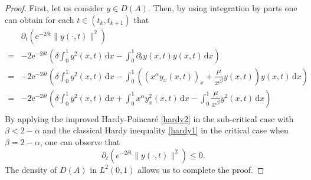 \documentclass[sn-mathphys]{sn-jnl}
\begin{document}
\begin{proof}
    First, let us consider $y \in D(A)$. Then, by using integration by parts one can obtain for each $t \in (t_k,t_{k+1})$ that
    \begin{align*}
        &\partial_t\left(\mathrm{e}^{-2\delta t} \|y(\cdot,t)\|^2\right)\\
        = &-2 \mathrm{e}^{-2\delta t}\left( \delta \int_0^1 y^2(x,t) \,\mathrm{d}x - \int_0^1 \partial_t y(x,t) y(x,t) \,\mathrm{d}x\right)\\
        = &-2 \mathrm{e}^{-2\delta t}\left( \delta \int_0^1 y^2(x,t) \,\mathrm{d}x - \int_0^1 \left( (x^{\alpha} y_x(x,t))_x + \dfrac{\mu}{x^{\beta}} y(x,t) \right) y(x,t) \,\mathrm{d}x\right)\\
        = &-2 \mathrm{e}^{-2\delta t}\left( \delta \int_0^1 y^2(x,t) \,\mathrm{d}x + \int_0^1 x^{\alpha} y_x^2(x,t) \,\mathrm{d}x - \int_0^1 \dfrac{\mu}{x^{\beta}} y^2(x,t) \,\mathrm{d}x \right)\\
    \end{align*}
    By applying the improved Hardy-Poincar\'e \eqref{hardy2} in the sub-critical case with $\beta<2-\alpha$ and the classical Hardy inequality \eqref{hardy1} in the critical case when $\beta=2-\alpha$, one can observe that
    \begin{equation*}
        \partial_t\left(e^{-2\delta t} \|y(\cdot,t)\|^2\right) \leq 0.
    \end{equation*}
    The density of $D(A)$ in $L^2(0,1)$ allows us to complete the proof.
\end{proof}
\end{document}

